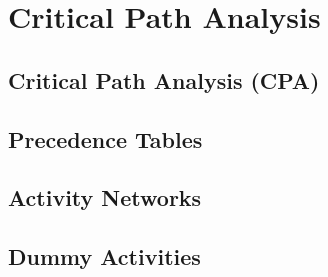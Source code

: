 \documentclass[../alevelmaths.tex]{subfiles}
\begin{document}
\chapter{Critical Path Analysis}
\section{Critical Path Analysis (CPA)}
\section{Precedence Tables}
\section{Activity Networks}
\section{Dummy Activities}
\end{document}
